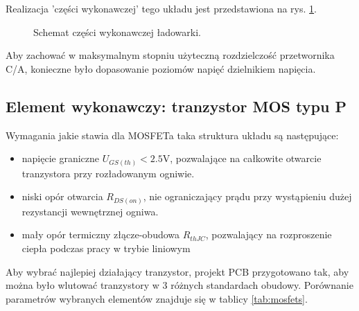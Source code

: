 \documentclass[polish,engineer]{polsl-msth}
\begin{document}
Realizacja 'części wykonawczej' tego układu jest przedstawiona na rys. \ref{img:charging_circuit}. 
\begin{figure}[hbtp]
     \caption{Schemat części wykonawczej ładowarki. \label{img:charging_circuit}}
\end{figure}
Aby zachować w maksymalnym stopniu użyteczną rozdzielczość przetwornika C/A, konieczne było dopasowanie poziomów napięć dzielnikiem napięcia.

\subsection{Element wykonawczy: tranzystor MOS typu P\label{section:mosfet} }
Wymagania jakie stawia dla MOSFETa taka struktura układu są następujące:
\begin{itemize}
    \item napięcie graniczne $U_{GS(th)} < 2.5\mathrm{V}$, pozwalające na całkowite otwarcie tranzystora przy rozładowanym ogniwie.
    \item niski opór otwarcia $R_{DS(on)}$, nie ograniczający prądu przy wystąpieniu dużej rezystancji wewnętrznej ogniwa.
    \item mały opór termiczny złącze-obudowa $R_{thJC}$, pozwalający na rozproszenie ciepła podczas pracy w trybie liniowym
\end{itemize}
Aby wybrać najlepiej działający tranzystor, projekt PCB przygotowano tak, aby można było wlutować tranzystory w 3 różnych standardach obudowy. Porównanie parametrów wybranych elementów znajduje się w tablicy \ref{tab:mosfets}.
\end{document}
